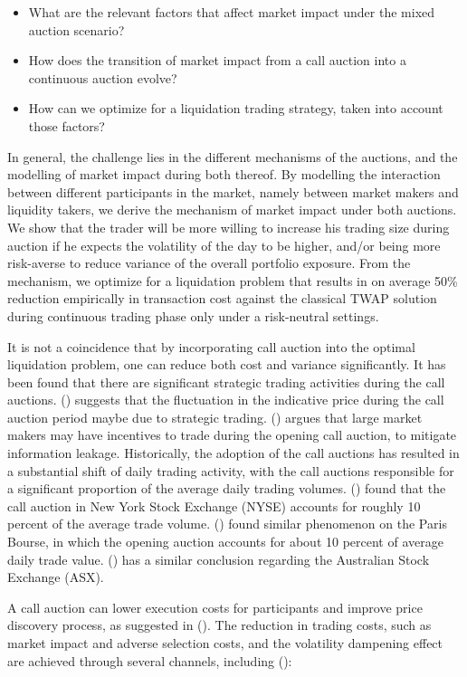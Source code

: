 \begin{itemize}
  \item What are the relevant factors that affect market impact under the mixed auction scenario?
  \item How does the transition of market impact from a call auction into a continuous auction evolve?
  \item How can we optimize for a liquidation trading strategy, taken into account those factors?
\end{itemize}

In general, the challenge lies in the different mechanisms of the auctions, and the modelling of market impact during both thereof. By modelling the interaction between different participants in the market, namely between market makers and liquidity takers, we derive the mechanism of market impact under both auctions. We show that the trader will be more willing to increase his trading size during auction if he expects the volatility of the day to be higher, and/or being more risk-averse to reduce variance of the overall portfolio exposure. From the mechanism, we optimize for a liquidation problem that results in on average 50\% reduction empirically in transaction cost against the classical TWAP solution during continuous trading phase only under a risk-neutral settings.

It is not a coincidence that by incorporating call auction into the optimal liquidation problem, one can reduce both cost and variance significantly. It has been found that there are significant strategic trading activities during the call auctions. (\cite{Bruno1999}) suggests that the fluctuation in the indicative price during the call auction period maybe due to strategic trading. (\cite{Vives2001}) argues that large market makers may have incentives to trade during the opening call auction, to mitigate information leakage. Historically, the adoption of the call auctions has resulted in a substantial shift of daily trading activity, with the call auctions responsible for a significant proportion of the average daily trading volumes. (\cite{Madhavan2015}) found that the call auction in New York Stock Exchange (NYSE) accounts for roughly 10 percent of the average trade volume. (\cite{Bruno1999}) found similar phenomenon on the Paris Bourse, in which the opening auction accounts for about 10 percent of average daily trade value. (\cite{Carole2006}) has a similar conclusion regarding the Australian Stock Exchange (ASX).

A call auction can lower execution costs for participants and improve price discovery process, as suggested in (\cite{Pagano2003}). The reduction in trading costs, such as market impact and adverse selection costs, and the volatility dampening effect are achieved through several channels, including (\cite{Carole2006}):

